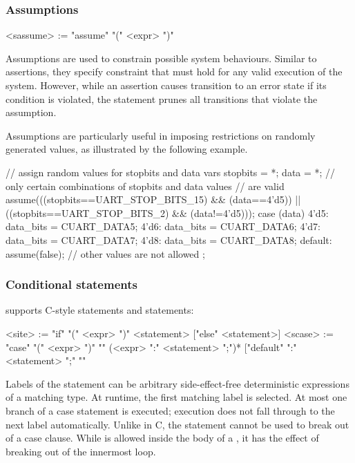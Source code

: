 \subsubsection{Assumptions}  

\begin{bnflisting}
<sassume> := "assume" "(" <expr> ")"
\end{bnflisting}

Assumptions are used to constrain possible system behaviours.  
Similar to assertions, they specify constraint that must hold for 
any valid execution of the system.  However, while an assertion 
causes transition to an error state if its condition is violated, 
the  statement prunes all transitions that violate the 
assumption.

Assumptions are particularly useful in imposing restrictions on 
randomly generated values, as illustrated by the following 
example.
\begin{tsllisting2}
// assign random values for stopbits and data vars
stopbits  = *;
data      = *;
// only certain combinations of stopbits and data values 
// are valid
assume(((stopbits==UART_STOP_BITS_15) && (data==4'd5)) || 
        ((stopbits==UART_STOP_BITS_2) && (data!=4'd5)));
case (data) {
    4'd5:       data_bits = CUART_DATA5;
    4'd6:       data_bits = CUART_DATA6;
    4'd7:       data_bits = CUART_DATA7;
    4'd8:       data_bits = CUART_DATA8;
    default: assume(false); // other values are not allowed
};
\end{tsllisting2}

\subsubsection{Conditional statements}\label{s:r:coniditional}

\tsl supports C-style  statements and  
statements:
\begin{bnflisting}
<site>  := "if" "(" <expr> ")" <statement>
             ["else" <statement>]
<scase> := "case" "(" <expr> ")" "{"
             (<expr> ":" <statement> ";")*
             ["default" ":" <statement> ";"
           "}"
\end{bnflisting}

Labels of the  statement can be arbitrary 
side-effect-free deterministic expressions of a matching type.  At 
runtime, the first matching label is selected.  At most one branch 
of a case statement is executed; execution does not fall through 
to the next label automatically.  Unlike in C, the  
statement cannot be used to break out of a case clause.  While 
 is allowed inside the body of a , it has the 
effect of breaking out of the innermost loop.

